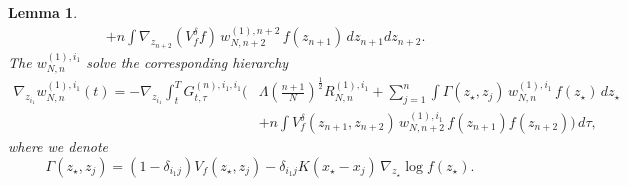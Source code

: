 \documentclass[pdflatex,sn-mathphys-num]{sn-jnl}
\theoremstyle{thmstyleone}%
\theoremstyle{thmstyletwo}%
\theoremstyle{thmstylethree}%
\newtheorem{lemma}{Lemma}
\begin{document}
\begin{lemma}
\[\begin{split}
&+ n \!\!\int \nabla_{z_{n+2}}(V_f^{\delta} f)\,
w_{N,n+2}^{(1),n+2}\, f(z_{n+1})\,dz_{n+1}dz_{n+2}.
\end{split}
\]
The \(w^{(1),i_1}_{N,n}\) solve the corresponding hierarchy
\[
\begin{aligned}
\nabla_{z_{i_1}} w^{(1),i_1}_{N,n}(t)
= -\nabla_{z_{i_1}} \int_t^T G^{(n),i_1,i_1}_{t,\tau}\Big(
&\Lambda\!\left(\tfrac{n+1}{N}\right)^{\frac12} R^{(1),i_1}_{N,n}
+ \sum_{j=1}^n \int \Gamma(z_\star,z_j)\, w^{(1),i_1}_{N,n}\, f(z_\star)\,dz_\star \\
&+ n \int V_f^\delta(z_{n+1},z_{n+2})\,
w^{(1),i_1}_{N,n+2}\,
f(z_{n+1}) f(z_{n+2})
\Big)\,d\tau,
\end{aligned}
\]
where we denote
\[
\Gamma(z_\star,z_j)
= (1-\delta_{i_1j})V_f(z_\star,z_j)
- \delta_{i_1j} K(x_\star-x_j)\,
\nabla_{z_\star}\log f(z_\star).
\]
\end{lemma}
\end{document}
